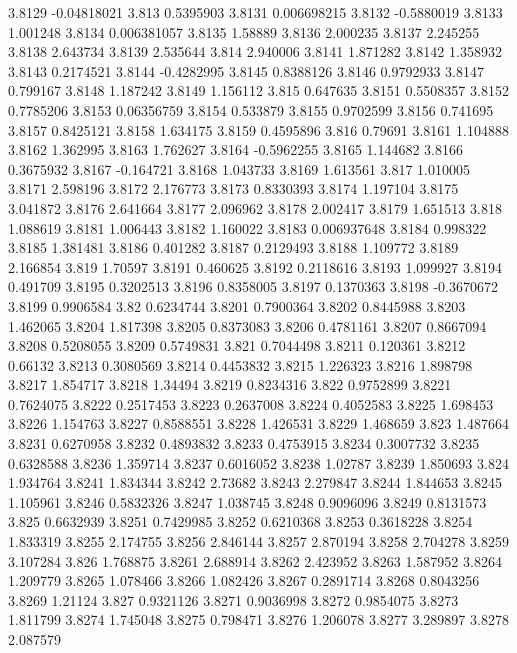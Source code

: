 3.8129  -0.04818021
3.813  0.5395903
3.8131  0.006698215
3.8132  -0.5880019
3.8133  1.001248
3.8134  0.006381057
3.8135  1.58889
3.8136  2.000235
3.8137  2.245255
3.8138  2.643734
3.8139  2.535644
3.814  2.940006
3.8141  1.871282
3.8142  1.358932
3.8143  0.2174521
3.8144  -0.4282995
3.8145  0.8388126
3.8146  0.9792933
3.8147  0.799167
3.8148  1.187242
3.8149  1.156112
3.815  0.647635
3.8151  0.5508357
3.8152  0.7785206
3.8153  0.06356759
3.8154  0.533879
3.8155  0.9702599
3.8156  0.741695
3.8157  0.8425121
3.8158  1.634175
3.8159  0.4595896
3.816  0.79691
3.8161  1.104888
3.8162  1.362995
3.8163  1.762627
3.8164  -0.5962255
3.8165  1.144682
3.8166  0.3675932
3.8167  -0.164721
3.8168  1.043733
3.8169  1.613561
3.817  1.010005
3.8171  2.598196
3.8172  2.176773
3.8173  0.8330393
3.8174  1.197104
3.8175  3.041872
3.8176  2.641664
3.8177  2.096962
3.8178  2.002417
3.8179  1.651513
3.818  1.088619
3.8181  1.006443
3.8182  1.160022
3.8183  0.006937648
3.8184  0.998322
3.8185  1.381481
3.8186  0.401282
3.8187  0.2129493
3.8188  1.109772
3.8189  2.166854
3.819  1.70597
3.8191  0.460625
3.8192  0.2118616
3.8193  1.099927
3.8194  0.491709
3.8195  0.3202513
3.8196  0.8358005
3.8197  0.1370363
3.8198  -0.3670672
3.8199  0.9906584
3.82  0.6234744
3.8201  0.7900364
3.8202  0.8445988
3.8203  1.462065
3.8204  1.817398
3.8205  0.8373083
3.8206  0.4781161
3.8207  0.8667094
3.8208  0.5208055
3.8209  0.5749831
3.821  0.7044498
3.8211  0.120361
3.8212  0.66132
3.8213  0.3080569
3.8214  0.4453832
3.8215  1.226323
3.8216  1.898798
3.8217  1.854717
3.8218  1.34494
3.8219  0.8234316
3.822  0.9752899
3.8221  0.7624075
3.8222  0.2517453
3.8223  0.2637008
3.8224  0.4052583
3.8225  1.698453
3.8226  1.154763
3.8227  0.8588551
3.8228  1.426531
3.8229  1.468659
3.823  1.487664
3.8231  0.6270958
3.8232  0.4893832
3.8233  0.4753915
3.8234  0.3007732
3.8235  0.6328588
3.8236  1.359714
3.8237  0.6016052
3.8238  1.02787
3.8239  1.850693
3.824  1.934764
3.8241  1.834344
3.8242  2.73682
3.8243  2.279847
3.8244  1.844653
3.8245  1.105961
3.8246  0.5832326
3.8247  1.038745
3.8248  0.9096096
3.8249  0.8131573
3.825  0.6632939
3.8251  0.7429985
3.8252  0.6210368
3.8253  0.3618228
3.8254  1.833319
3.8255  2.174755
3.8256  2.846144
3.8257  2.870194
3.8258  2.704278
3.8259  3.107284
3.826  1.768875
3.8261  2.688914
3.8262  2.423952
3.8263  1.587952
3.8264  1.209779
3.8265  1.078466
3.8266  1.082426
3.8267  0.2891714
3.8268  0.8043256
3.8269  1.21124
3.827  0.9321126
3.8271  0.9036998
3.8272  0.9854075
3.8273  1.811799
3.8274  1.745048
3.8275  0.798471
3.8276  1.206078
3.8277  3.289897
3.8278  2.087579
